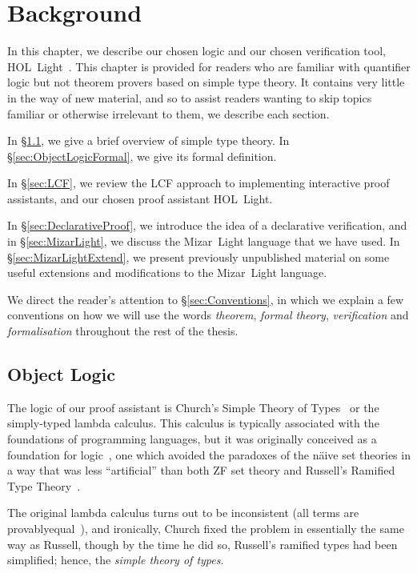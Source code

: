 \chapter{Background}\label{chapter:Background}
In this chapter, we describe our chosen logic and our chosen verification tool, \linebreak HOL~Light~\cite{HOLLight}. This chapter is provided for readers who are familiar with quantifier logic but not theorem provers based on simple type theory. It contains very little in the way of new material, and so to assist readers wanting to skip topics familiar or otherwise irrelevant to them, we describe each section.

In \S\ref{sec:ObjectLogic}, we give a brief overview of simple type theory. In \S\ref{sec:ObjectLogicFormal}, we give its formal definition.

In \S\ref{sec:LCF}, we review the LCF approach to implementing interactive proof assistants, and our chosen proof assistant HOL~Light.

In \S\ref{sec:DeclarativeProof}, we introduce the idea of a declarative verification, and in \S\ref{sec:MizarLight}, we discuss the Mizar~Light language that we have used. In \S\ref{sec:MizarLightExtend}, we present previously unpublished material on some useful extensions and modifications to the Mizar~Light language.

We direct the reader's attention to \S\ref{sec:Conventions}, in which we explain a few conventions on how we will use the words \emph{theorem}, \emph{formal theory}, \emph{verification} and \emph{formalisation} throughout the rest of the thesis.

\section{Object Logic}\label{sec:ObjectLogic}
The logic of our proof assistant is Church's Simple Theory of Types~\cite{ChurchTheoryOfTypes} or the simply-typed lambda calculus. This calculus is typically associated with the foundations of programming languages, but it was originally conceived as a foundation for logic~\cite{UntypedTheoryLambdaCalculus}, one which avoided the paradoxes of the n\"{a}ive set theories in a way that was less ``artificial'' than both ZF set theory and Russell's Ramified Type Theory~\cite{RussellTheoryOfTypes}.

The original lambda calculus turns out to be inconsistent (all terms are provably\linebreak equal~\cite{InconsistencyLambdaCalculus}), and ironically, Church fixed the problem in essentially the same way as Russell, though by the time he did so, Russell's ramified types had been simplified; hence, the \emph{simple theory of types}.


